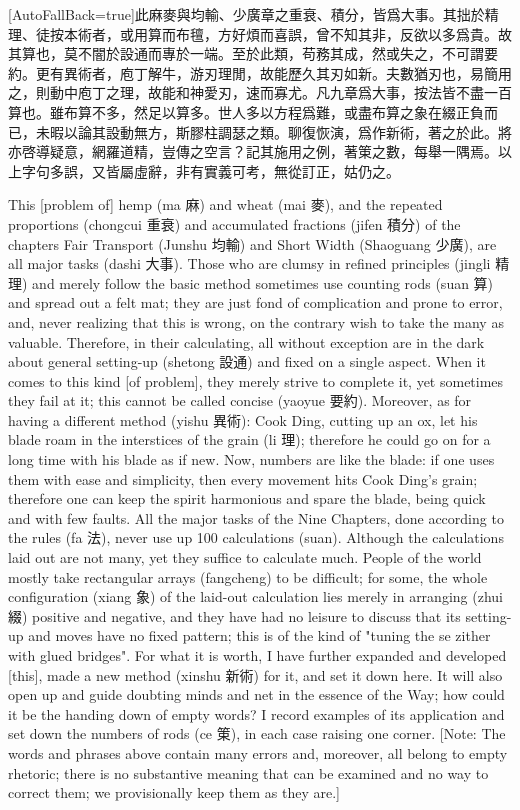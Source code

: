 \documentclass[11pt]{article}
\newcommand{\zhsmall}{\footnotesize\color{black!70}}
\newcommand{\unitlabel}[1]{\marginpar{\raggedleft\tiny\color{gray}#1}}
\newenvironment{unitzh}{\par\CJKfontspec{Noto Serif CJK SC}[AutoFallBack=true]\large\linespread{1.25}\selectfont}{\par}
\newenvironment{uniten}{\par\small\color{black!85}}{\par\medskip}
\begin{document}
\begin{unitzh}\unitlabel{jiuzhang-037.4}此麻麥與均輸、少廣章之重衰、積分，皆爲大事。其拙於精理、徒按本術者，或用算而布氊，方好煩而喜誤，曾不知其非，反欲以多爲貴。故其算也，莫不闇於設通而專於一端。至於此類，苟務其成，然或失之，不可謂要約。更有異術者，庖丁解牛，游刃理閒，故能歷久其刃如新。夫數猶刃也，易簡用之，則動中庖丁之理，故能和神愛刃，速而寡尤。凡九章爲大事，按法皆不盡一百算也。雖布算不多，然足以算多。世人多以方程爲難，或盡布算之象在綴正負而已，未暇以論其設動無方，斯膠柱調瑟之類。聊復恢演，爲作新術，著之於此。將亦啓導疑意，網羅道精，豈傳之空言？記其施用之例，著䇿之數，每舉一隅焉。{\zhsmall 以上字句多誤，又皆屬虛辭，非有實義可考，無從訂正，姑仍之。}\end{unitzh}
\begin{uniten}This [problem of] hemp (ma 麻) and wheat (mai 麥), and the repeated proportions (chongcui 重衰) and accumulated fractions (jifen 積分) of the chapters Fair Transport (Junshu 均輸) and Short Width (Shaoguang 少廣), are all major tasks (dashi 大事). Those who are clumsy in refined principles (jingli 精理) and merely follow the basic method sometimes use counting rods (suan 算) and spread out a felt mat; they are just fond of complication and prone to error, and, never realizing that this is wrong, on the contrary wish to take the many as valuable. Therefore, in their calculating, all without exception are in the dark about general setting-up (shetong 設通) and fixed on a single aspect. When it comes to this kind [of problem], they merely strive to complete it, yet sometimes they fail at it; this cannot be called concise (yaoyue 要約). Moreover, as for having a different method (yishu 異術): Cook Ding, cutting up an ox, let his blade roam in the interstices of the grain (li 理); therefore he could go on for a long time with his blade as if new. Now, numbers are like the blade: if one uses them with ease and simplicity, then every movement hits Cook Ding's grain; therefore one can keep the spirit harmonious and spare the blade, being quick and with few faults. All the major tasks of the Nine Chapters, done according to the rules (fa 法), never use up 100 calculations (suan). Although the calculations laid out are not many, yet they suffice to calculate much. People of the world mostly take rectangular arrays (fangcheng) to be difficult; for some, the whole configuration (xiang 象) of the laid-out calculation lies merely in arranging (zhui 綴) positive and negative, and they have had no leisure to discuss that its setting-up and moves have no fixed pattern; this is of the kind of "tuning the se zither with glued bridges". For what it is worth, I have further expanded and developed [this], made a new method (xinshu 新術) for it, and set it down here. It will also open up and guide doubting minds and net in the essence of the Way; how could it be the handing down of empty words? I record examples of its application and set down the numbers of rods (ce 䇿), in each case raising one corner. [Note: The words and phrases above contain many errors and, moreover, all belong to empty rhetoric; there is no substantive meaning that can be examined and no way to correct them; we provisionally keep them as they are.]\end{uniten}
\end{document}
